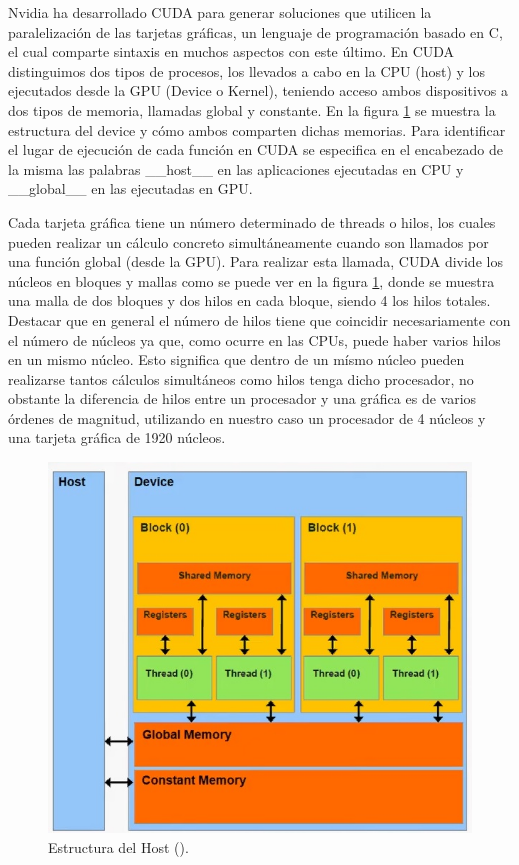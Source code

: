 \documentclass[11pt,a4paper,twoside,pdf]{article}
\numberwithin{equation}{section}
\begin{document}
Nvidia ha desarrollado CUDA para generar soluciones que utilicen la paralelización de las tarjetas gráficas, un lenguaje de programación basado en C, el cual comparte sintaxis en muchos aspectos con este último. En CUDA distinguimos dos tipos de procesos, los llevados a cabo en la CPU (host) y los ejecutados desde la GPU (Device o Kernel), teniendo acceso ambos dispositivos a dos tipos de memoria, llamadas global y constante. En la figura \ref{fig:componentes gpu} se muestra la estructura del device y cómo ambos comparten dichas memorias. Para identificar el lugar de ejecución de cada función en CUDA se especifica en el encabezado de la misma las palabras \_\_host\_\_ en las aplicaciones ejecutadas en CPU y \_\_global\_\_ en las ejecutadas en GPU.

Cada tarjeta gráfica tiene un número determinado de threads o hilos, los cuales pueden realizar un cálculo concreto simultáneamente cuando son llamados por una función global (desde la GPU). Para realizar esta llamada, CUDA divide los núcleos en bloques y mallas como se puede ver en la figura \ref{fig:componentes gpu}, donde se muestra una malla de dos bloques y dos hilos en cada bloque, siendo 4 los hilos totales. Destacar que en general el número de hilos tiene que coincidir necesariamente con el número de núcleos ya que, como ocurre en las CPUs, puede haber varios hilos en un mismo núcleo. Esto significa que dentro de un mísmo núcleo pueden realizarse tantos cálculos simultáneos como hilos tenga dicho procesador, no obstante la diferencia de hilos entre un procesador y una gráfica es de varios órdenes de magnitud, utilizando en nuestro caso un procesador de 4 núcleos y una tarjeta gráfica de 1920 núcleos.

\begin{figure}[h]
\centering
\includegraphics[width=10 cm]{Nvidia-Device_Structure.jpg}				
\caption{Estructura del Host (\cite{web}). }
\label{fig:componentes gpu}
\end{figure}
\noindent
\end{document}
